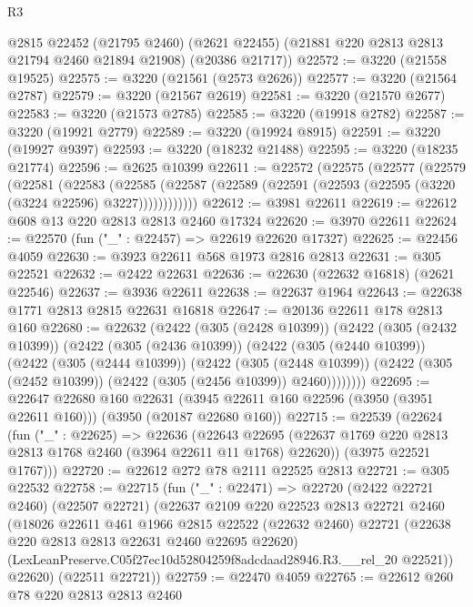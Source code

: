 \begin{lexlean}{R3}
\begin{coremodule}
      @2815
      @22452
      (@21795 @2460)
      (@2621 @22455)
      (@21881 @220 @2813 @2813 @21794 @2460 @21894 @21908)
      (@20386 @21717))
@22572 := @3220 (@21558 @19525)
@22575 := @3220 (@21561 (@2573 @2626))
@22577 := @3220 (@21564 @2787)
@22579 := @3220 (@21567 @2619)
@22581 := @3220 (@21570 @2677)
@22583 := @3220 (@21573 @2785)
@22585 := @3220 (@19918 @2782)
@22587 := @3220 (@19921 @2779)
@22589 := @3220 (@19924 @8915)
@22591 := @3220 (@19927 @9397)
@22593 := @3220 (@18232 @21488)
@22595 := @3220 (@18235 @21774)
@22596 := @2625 @10399
@22611 := @22572
    (@22575
      (@22577
        (@22579
          (@22581
            (@22583
              (@22585
                (@22587 (@22589 (@22591 (@22593 (@22595 (@3220 (@3224 @22596) @3227))))))))))))
@22612 := @3981 @22611
@22619 := @22612 @608 @13 @220 @2813 @2813 @2460 @17324
@22620 := @3970 @22611
@22624 := @22570 (fun ("_" : @22457) => @22619 @22620 @17327)
@22625 := @22456 @4059
@22630 := @3923 @22611 @568 @1973 @2816 @2813
@22631 := @305 @22521
@22632 := @2422 @22631
@22636 := @22630 (@22632 @16818) (@2621 @22546)
@22637 := @3936 @22611
@22638 := @22637 @1964
@22643 := @22638 @1771 @2813 @2815 @22631 @16818
@22647 := @20136 @22611 @178 @2813 @160
@22680 := @22632
    (@2422
      (@305 (@2428 @10399))
      (@2422
        (@305 (@2432 @10399))
        (@2422
          (@305 (@2436 @10399))
          (@2422
            (@305 (@2440 @10399))
            (@2422
              (@305 (@2444 @10399))
              (@2422
                (@305 (@2448 @10399))
                (@2422 (@305 (@2452 @10399)) (@2422 (@305 (@2456 @10399)) @2460))))))))
@22695 := @22647
    @22680
    @160
    @22631
    (@3945 @22611 @160 @22596 (@3950 (@3951 @22611 @160)))
    (@3950 (@20187 @22680 @160))
@22715 := @22539
    (@22624
      (fun ("_" : @22625) =>
      @22636
        (@22643 @22695 (@22637 @1769 @220 @2813 @2813 @1768 @2460 (@3964 @22611 @11 @1768) @22620))
        (@3975 @22521 @1767)))
@22720 := @22612 @272 @78 @2111 @22525 @2813
@22721 := @305 @22532
@22758 := @22715
    (fun ("_" : @22471) =>
    @22720
      (@2422 @22721 @2460)
      (@22507 @22721)
      (@22637
        @2109
        @220
        @22523
        @2813
        @22721
        @2460
        (@18026
          @22611
          @461
          @1966
          @2815
          @22522
          (@22632 @2460)
          @22721
          (@22638 @220 @2813 @2813 @22631 @2460 @22695 @22620)
          (LexLeanPreserve.C05f27ec10d52804259f8adcdaad28946.R3.__rel_20 @22521))
        @22620)
      (@22511 @22721))
@22759 := @22470 @4059
@22765 := @22612 @260 @78 @220 @2813 @2813 @2460

\end{coremodule}
\end{lexlean}
